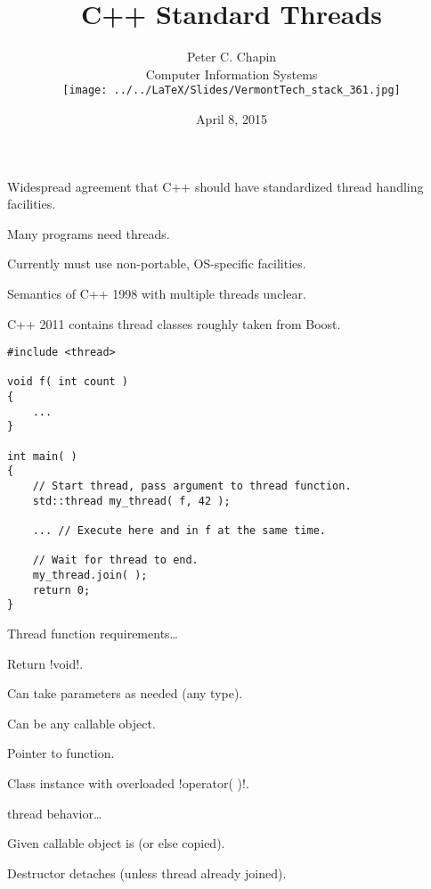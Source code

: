 \documentclass[landscape]{slides}
\title{\color{titlecolor}C++ Standard Threads}
\author{
  \begin{tabular}{c}
  \\[3mm]
  \Large{Peter C. Chapin} \\[2mm]
  \normalsize{Computer Information Systems}\\[5mm]
  \texttt{[image: ../../LaTeX/Slides/VermontTech\_stack\_361.jpg]}\\[16mm]
  \end{tabular}
}
\date{April 8, 2015}
\begin{document}
\color{Black}
\pagecolor{Background}

\maketitle


\begin{citemize}
\item {} Widespread agreement that C++ should have standardized thread handling
  facilities.
\begin{citemize}
  \item Many programs need threads.
  \item Currently must use non-portable, OS-specific facilities.
  \item Semantics of C++ 1998 with multiple threads unclear.
  \item C++ 2011 contains thread classes roughly taken from Boost.
\end{citemize}
\end{citemize}
\stopslide


{\small
\begin{lstlisting}
#include <thread>

void f( int count )
{
    ...
}

int main( )
{
    // Start thread, pass argument to thread function.
    std::thread my_thread( f, 42 );

    ... // Execute here and in f at the same time.

    // Wait for thread to end.
    my_thread.join( );
    return 0;
}
\end{lstlisting}
}
\stopslide


\begin{citemize}
  \item Thread function requirements\ldots
  \begin{citemize}
    \item Return !void!.
    \item Can take parameters as needed (any type).
    \item Can be any callable object.
      \begin{citemize}
        \item Pointer to function.
        \item Class instance with overloaded !operator( )!.
      \end{citemize}
  \end{citemize}

  \item thread behavior\ldots
    \begin{citemize}
      \item Given callable object is  (or else copied).
      \item Destructor detaches (unless thread already joined).
    \end{citemize}
\end{citemize}
\stopslide
\end{document}

